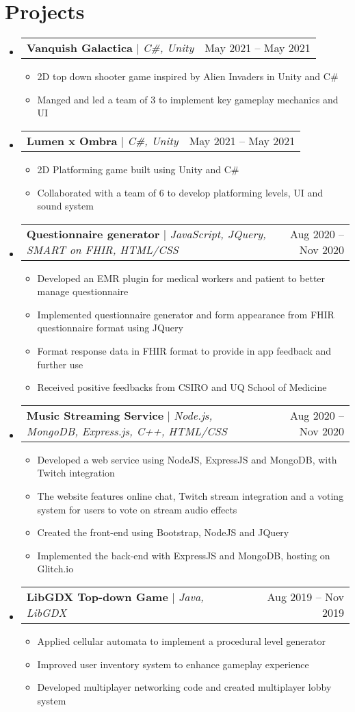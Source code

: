 \documentclass[letterpaper,11pt]{article}
\makeatletter
\newcommand{\resumeItem}[1]{
  \item\small{
    {#1 \vspace{-2pt}}
  }
}
\newcommand{\resumeProjectHeading}[2]{
    \item
    \begin{tabular*}{0.97\textwidth}{l@{\extracolsep{\fill}}r}
      \small#1 & #2 \\
    \end{tabular*}\vspace{-7pt}
}
\newcommand{\resumeSubHeadingListStart}{\begin{itemize}[leftmargin=0.15in, label={}]}
\newcommand{\resumeSubHeadingListEnd}{\end{itemize}}
\newcommand{\resumeItemListStart}{\begin{itemize}}
\newcommand{\resumeItemListEnd}{\end{itemize}\vspace{-5pt}}
\makeatother
\begin{document}
\section{Projects}
    \resumeSubHeadingListStart
	\resumeProjectHeading
          {\textbf{Vanquish Galactica} $|$ \emph{C\#, Unity}}{May 2021 -- May 2021}
          \resumeItemListStart
            \resumeItem{2D top down shooter game inspired by Alien Invaders in Unity and C\#}
            \resumeItem{Manged and led a team of 3 to implement key gameplay mechanics and UI}
          \resumeItemListEnd
	\resumeProjectHeading
          {\textbf{Lumen x Ombra} $|$ \emph{C\#, Unity}}{May 2021 -- May 2021}
          \resumeItemListStart
            \resumeItem{2D Platforming game built using Unity and C\#}
            \resumeItem{Collaborated with a team of 6 to develop platforming levels, UI and sound system}
          \resumeItemListEnd
      \resumeProjectHeading
          {\textbf{Questionnaire generator} $|$ \emph{JavaScript, JQuery, SMART on FHIR, HTML/CSS}}{Aug 2020 -- Nov 2020}
          \resumeItemListStart
            \resumeItem{Developed an EMR plugin for medical workers and patient to better manage questionnaire}
            \resumeItem{Implemented questionnaire generator and form appearance from FHIR questionnaire format using JQuery}
            \resumeItem{Format response data in FHIR format to provide in app feedback and further use}
            \resumeItem{Received positive feedbacks from CSIRO and UQ School of Medicine}
          \resumeItemListEnd
      \resumeProjectHeading
          {\textbf{Music Streaming Service} $|$ \emph{Node.js, MongoDB, Express.js, C++, HTML/CSS}}{Aug 2020 -- Nov 2020}
          \resumeItemListStart 
           \resumeItem{Developed a web service using NodeJS, ExpressJS and MongoDB, with Twitch integration}
           \resumeItem{The website features online chat, Twitch stream integration and a voting system for users to vote on stream audio effects}
            \resumeItem{Created the front-end using Bootstrap, NodeJS and JQuery}
            \resumeItem{Implemented the back-end with ExpressJS and MongoDB, hosting on Glitch.io}
          \resumeItemListEnd

	\resumeProjectHeading
          {\textbf{LibGDX Top-down Game} $|$ \emph{Java, LibGDX}}{Aug 2019 -- Nov 2019}
          \resumeItemListStart
            \resumeItem{Applied cellular automata to implement a procedural level generator}
            \resumeItem{Improved user inventory system to enhance gameplay experience}
            \resumeItem{Developed multiplayer networking code and created multiplayer lobby system}
          \resumeItemListEnd
    \resumeSubHeadingListEnd
\end{document}
